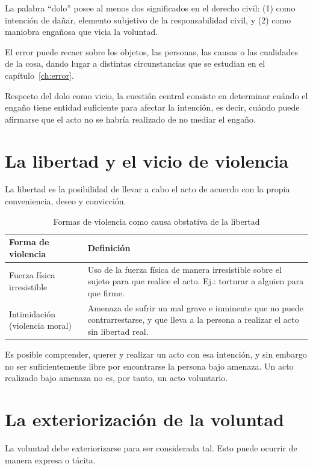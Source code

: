 \documentclass[12pt,oneside]{book}
\begin{document}
La palabra ``dolo'' posee al menos dos significados en el derecho civil: (1) como intención de dañar, elemento subjetivo de la responsabilidad civil, y (2) como maniobra engañosa que vicia la voluntad.

El error puede recaer sobre los objetos, las personas, las causas o las cualidades de la cosa, dando lugar a distintas circunstancias que se estudian en el capítulo~\ref{ch:error}.

Respecto del dolo como vicio, la cuestión central consiste en determinar cuándo el engaño tiene entidad suficiente para afectar la intención, es decir, cuándo puede afirmarse que el acto no se habría realizado de no mediar el engaño.

\section{La libertad y el vicio de violencia}

La libertad es la posibilidad de llevar a cabo el acto de acuerdo con la propia conveniencia, deseo y convicción.

\begin{table}[H]
\centering
\caption{Formas de violencia como causa obstativa de la libertad}
\begin{tabularx}{\textwidth}{l X}
\toprule
\textbf{Forma de violencia} & \textbf{Definición} \\
\midrule
Fuerza física irresistible & Uso de la fuerza física de manera irresistible sobre el sujeto para que realice el acto. Ej.: torturar a alguien para que firme. \\
Intimidación (violencia moral) & Amenaza de sufrir un mal grave e inminente que no puede contrarrestarse, y que lleva a la persona a realizar el acto sin libertad real. \\
\bottomrule
\end{tabularx}
\end{table}

Es posible comprender, querer y realizar un acto con esa intención, y sin embargo no ser suficientemente libre por encontrarse la persona bajo amenaza. Un acto realizado bajo amenaza no es, por tanto, un acto voluntario.

\section{La exteriorización de la voluntad}

La voluntad debe exteriorizarse para ser considerada tal. Esto puede ocurrir de manera expresa o tácita.
\end{document}
